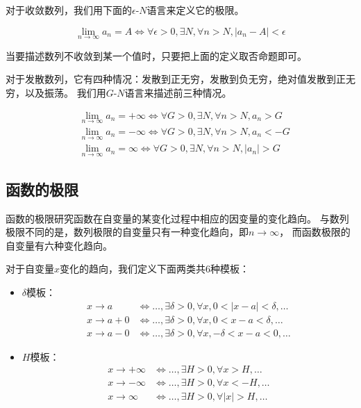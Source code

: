 对于收敛数列，我们用下面的$\epsilon$-$N$语言来定义它的极限。
\begin{definition}
  \begin{displaymath}
    \lim_{n\to\infty}a_n=A
    \iff \forall\epsilon>0,\exists N,\forall n>N,|a_n - A|<\epsilon
  \end{displaymath}
\end{definition}
\begin{remark}
  当要描述数列不收敛到某一个值时，只要把上面的定义取否命题即可。
\end{remark}

对于发散数列，它有四种情况：发散到正无穷，发散到负无穷，绝对值发散到正无穷，以及振荡。
我们用$G$-$N$语言来描述前三种情况。
\begin{definition}
  \begin{align*}
    &\lim_{n\to\infty}a_n=+\infty
    \iff \forall G>0,\exists N,\forall n>N, a_n > G \\
    &\lim_{n\to\infty}a_n=-\infty
    \iff \forall G>0,\exists N,\forall n>N, a_n < -G \\
    &\lim_{n\to\infty}a_n=\infty
    \iff \forall G>0,\exists N,\forall n>N, |a_n| > G
  \end{align*}
\end{definition}

\subsection{函数的极限}
函数的极限研究函数在自变量的某变化过程中相应的因变量的变化趋向。
与数列极限不同的是，数列极限的自变量只有一种变化趋向，即$n\to\infty$，
而函数极限的自变量有六种变化趋向。

对于自变量$x$变化的趋向，我们定义下面两类共6种模板：
\begin{itemize}
  \item $\delta$模板：
  \begin{align*}
    x\to a
    &\iff \dots, \exists \delta > 0,\forall x, 0<|x-a|<\delta, \dots \\
    x\to a+0
    &\iff \dots, \exists \delta > 0,\forall x, 0<x-a<\delta, \dots \\
    x\to a-0
    &\iff \dots, \exists \delta > 0,\forall x, -\delta<x-a<0, \dots
  \end{align*}
    \item $H$模板：
  \begin{align*}
    x\to+\infty
    &\iff \dots, \exists H > 0, \forall x > H, \dots \\
    x\to-\infty
    &\iff \dots, \exists H > 0, \forall x < -H, \dots \\
    x\to\infty
    &\iff \dots, \exists H > 0, \forall |x| > H, \dots
  \end{align*}
\end{itemize}

